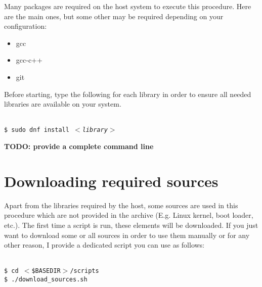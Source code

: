 \documentclass[openany,a4paper]{book}
\begin{document}
Many packages are required on the host system to execute this procedure.
Here are the main ones, but some other may be required depending on your configuration:
\begin{itemize}
\setlength\parskip{0pt}
\item gcc
\item gcc-c++
\item git
\end{itemize}

Before starting, type the following for each library in order to ensure all needed libraries are available on your system.
\begin{tabbing}
\kill \hspace{1cm} \= \\
\> \texttt{\$ sudo dnf install \textit{$<$library$>$}} \\
\end{tabbing}

\textbf{TODO: provide a complete command line}


\section{Downloading required sources}

Apart from the libraries required by the host, some sources are used in this procedure which are not provided in the archive (E.g. Linux kernel, boot loader, etc.).
The first time a script is run, these elements will be downloaded.
If you just want to download some or all sources in order to use them manually or for any other reason, I provide a dedicated script you can use as follows:

\begin{tabbing}
\kill \hspace{1cm} \= \\
\> \texttt{\$ cd $<$\$BASEDIR$>$/scripts}\\
\> \texttt{\$ ./download\_sources.sh}\\
\end{tabbing}
\end{document}
